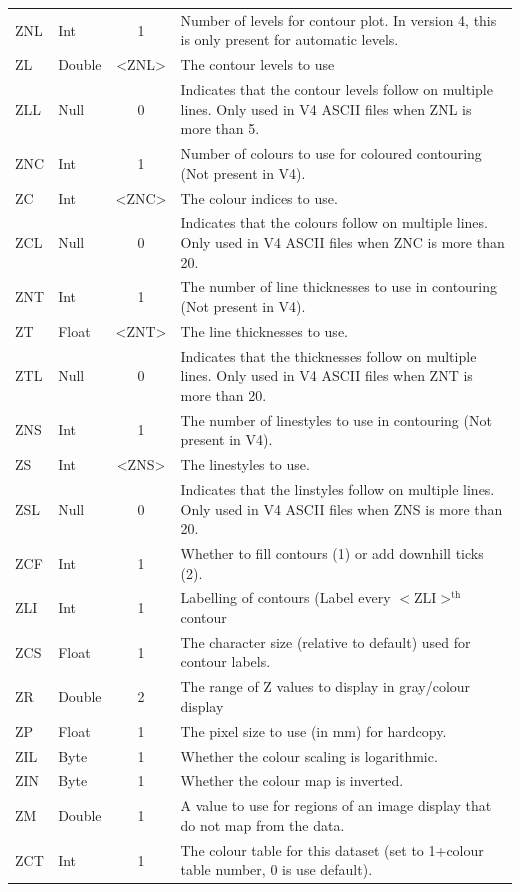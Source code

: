 \documentclass[english]{article}
\begin{document}
\begin{longtable}{|llcp{8cm}|}
  ZNL& Int& 1&
  Number of levels for contour plot. In version 4, this is only present
  for automatic levels.\\
  ZL& Double& <ZNL>&
  The contour levels to use\\
  ZLL & Null & 0 & Indicates that the contour levels follow on multiple
  lines. Only used in V4 ASCII files when ZNL is more than 5.\\
  ZNC& Int& 1&
  Number of colours to use for coloured contouring (Not present in V4).\\
  ZC& Int& <ZNC>&
  The colour indices to use.\\
  ZCL & Null & 0 & Indicates that the colours follow on multiple
  lines. Only used in V4 ASCII files when ZNC is more than 20.\\
  ZNT& Int & 1&
  The number of line thicknesses to use in contouring (Not present in V4).\\
  ZT& Float& <ZNT>&
  The line thicknesses to use.\\
  ZTL & Null & 0 & Indicates that the thicknesses follow on multiple
  lines. Only used in V4 ASCII files when ZNT is more than 20.\\
  ZNS& Int& 1&
  The number of linestyles to use in contouring (Not present in V4).\\
  ZS& Int& <ZNS>&
  The linestyles to use.\\
  ZSL & Null & 0 & Indicates that the linstyles follow on multiple
  lines. Only used in V4 ASCII files when ZNS is more than 20.\\
  ZCF& Int& 1&
  Whether to fill contours (1) or add downhill ticks (2).\\
  ZLI& Int& 1&
  Labelling of contours (Label every $\mathrm{<ZLI>^{th}}$ contour\\
  ZCS & Float & 1 & The character size (relative to default) used for
  contour labels.\\
  ZR& Double& 2&
  The range of Z values to display in gray/colour display\\
  ZP& Float& 1&
  The pixel size to use (in mm) for hardcopy.\\
  ZIL & Byte & 1 & Whether the colour scaling is logarithmic.\\
  ZIN & Byte & 1 & Whether the colour map is inverted.\\
  ZM & Double & 1 & A value to use for regions of an image display that
  do not map from the data.\\
  ZCT & Int & 1 & The colour table for this dataset (set to 1+colour
  table number, 0 is use default).\\

\end{longtable}
\end{document}
